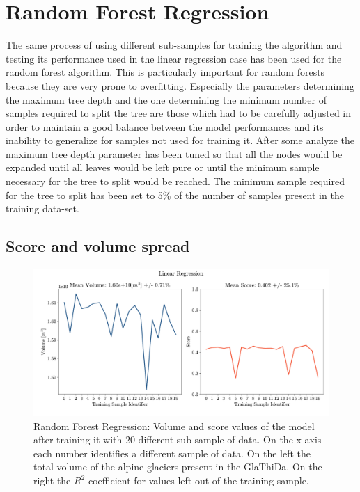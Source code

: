 \section{Random Forest Regression}\label{rfr}
The same process of using different sub-samples for training the algorithm and testing its performance used in the linear regression case has been used for the random forest algorithm. This is particularly important for random forests because they are very prone to overfitting. Especially the parameters determining the maximum tree depth and the one determining the minimum number of samples required to split the tree are those which had to be carefully adjusted in order to maintain a good balance between the model performances and its inability to generalize for samples not used for training it. After some analyze the maximum tree depth parameter has been tuned so that all the nodes would be expanded until all leaves would be left pure or until the minimum sample necessary for the tree to split would be reached. The minimum sample required for the tree to split has been set to 5\% of the number of samples present in the training data-set.  

\subsection{Score and volume spread}\label{rfr-score}

\begin{figure}[!tp]
	\centering		  
	\includegraphics[width=1.\textwidth]{figures/LR_score.pdf}
	\caption{Random Forest Regression: Volume and score values of the model after training it with 20 different sub-sample of data. On the x-axis each number identifies a different sample of data. On the left the total volume of the alpine glaciers present in the GlaThiDa. On the right the $R^2$ coefficient for values left out of the training sample.}
	\label{fig:rfr-score}
\end{figure}

